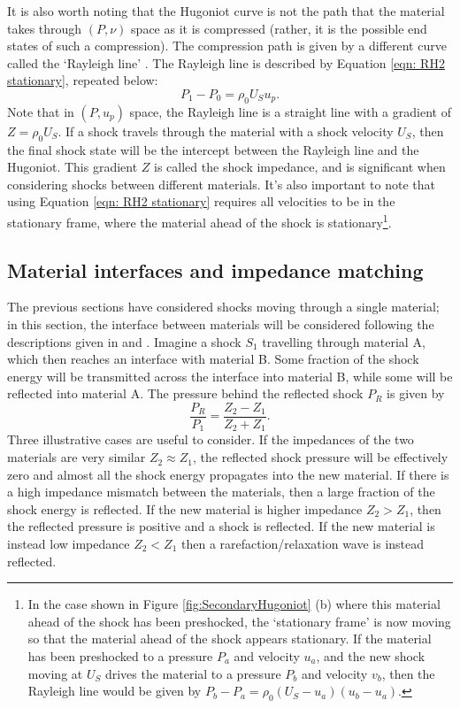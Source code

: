 It is also worth noting that the Hugoniot curve is not the path that the material takes through $(P, \nu)$ space as it is compressed (rather, it is the possible end states of such a compression). The compression path is given by a different curve called the `Rayleigh line' \cite{Forbes2012}. The Rayleigh line is described by Equation \ref{eqn: RH2 stationary}, repeated below:
\begin{equation} P_1 - P_0 = \rho_0 U_S u_p.  \end{equation}
Note that in $(P, u_p)$ space, the Rayleigh line is a straight line with a gradient of $Z = \rho_0 U_S$. If a shock travels through the material with a shock velocity $U_S$, then the final shock state will be the intercept between the Rayleigh line and the Hugoniot. This gradient $Z$ is called the shock impedance, and is significant when considering shocks between different materials. It's also important to note that using Equation \ref{eqn: RH2 stationary} requires all velocities to be in the stationary frame, where the material ahead of the shock is stationary\footnote{In the case shown in Figure \ref{fig:SecondaryHugoniot} (b) where this material ahead of the shock has been preshocked, the `stationary frame' is now moving so that the material ahead of the shock appears stationary. If the material has been preshocked to a pressure $P_a$ and velocity $u_a$, and the new shock moving at $U_S$ drives the material to a pressure $P_b$ and velocity $v_b$, then the Rayleigh line would be given by $P_b - P_a = \rho_0 (U_S - u_a) (u_b - u_a).$ }.

\subsection{Material interfaces and impedance matching \label{IMTheory}}

The previous sections have considered shocks moving through a single material; in this section, the interface between materials will be considered following the descriptions given in \cite{Forbes2012} and \cite{Davison2008}. Imagine a shock $S_1$ travelling through material A, which then reaches an interface with material B. Some fraction of the shock energy will be transmitted across the interface into material B, while some will be reflected into material A. The pressure behind the reflected shock $P_R$ is given \cite{Colvin2013} by 
\begin{equation} \frac{P_R}{P_1} = \frac{Z_2 - Z_1}{Z_2 + Z_1}.  \end{equation}
Three illustrative cases are useful to consider. If the impedances of the two materials are very similar $Z_2 \approx Z_1$, the reflected shock pressure will be effectively zero and almost all the shock energy propagates into the new material. If there is a high impedance mismatch between the materials, then a large fraction of the shock energy is reflected. If the new material is higher impedance $Z_2 > Z_1$, then the reflected pressure is positive and a shock is reflected. If the new material is instead low impedance $Z_2 < Z_1$ then a rarefaction/relaxation wave is instead reflected.

